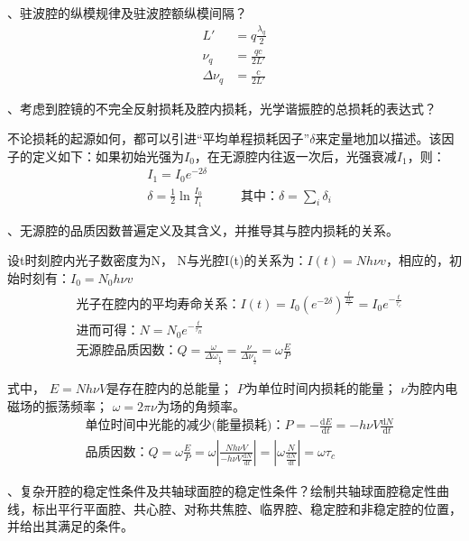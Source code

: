 \documentclass[12pt]{article}
\begin{document}
{、驻波腔的纵模规律及驻波腔额纵模间隔？
}
{\kaishu
\begin{align*}
    L'&=q\frac{\lambda_q}{2}\\
    \nu_q&=\frac{qc}{2L'}\\
    \Delta\nu_q&=\frac{c}{2L'}
\end{align*}
}

{、考虑到腔镜的不完全反射损耗及腔内损耗，光学谐振腔的总损耗的表达式？
}
{\kaishu
\par  
不论损耗的起源如何，都可以引进“平均单程损耗因子”$\delta$来定量地加以描述。该因子的定义如下：如果初始光强为$I_0$，在无源腔内往返一次后，光强衰减$I_1$，则：
\begin{align*}
    &I_1=I_0e^{-2\delta}\\
    &\delta=\frac{1}{2}\ln\frac{I_0}{I_1}
    \quad\quad\quad
    \text{其中：}\delta=\sum_i \delta_i
\end{align*}
}

{、无源腔的品质因数普遍定义及其含义，并推导其与腔内损耗的关系。
}
{\kaishu

设t时刻腔内光子数密度为N，
N与光腔I(t)的关系为：$I(t)=Nh\nu v$，相应的，初始时刻有：$I_0=N_0h\nu v $
\begin{align}
    &\text{光子在腔内的平均寿命关系：}
    I(t)
    =I_0(e^{-2\delta})^{\frac{t}{\frac{2L'}{c}}}
    =I_0e^{-\frac{t}{\tau_c}}\\
    &\text{进而可得：}N=N_0e^{-\frac{t}{\tau_R}}\\
    &\text{无源腔品质因数：}
    Q
    =\frac{\omega}{\Delta\omega_{\frac{1}{2}}}
    =\frac{\nu}{\Delta\nu_{\frac{1}{2}}}
    =\omega\frac{E}{P}
\end{align}
\par 式中，
$E=Nh\nu V$是存在腔内的总能量；
$P$为单位时间内损耗的能量；
$\nu$为腔内电磁场的振荡频率；
$\omega=2\pi\nu$为场的角频率。
\begin{align}
    &\text{单位时间中光能的减少(能量损耗)：}
    P
    =-\frac{\mathrm{d}E}{\mathrm{d}t}
    =-h\nu V\frac{\mathrm{d}N}{\mathrm{d}t}\\
    &\text{品质因数：}Q
    =\omega\frac{E}{P}=
    \omega\left|
    \frac
    {Nh\nu V}
    {-h\nu V\frac{\mathrm{d}N}{\mathrm{d}t}}
    \right|
    =
    \left|\omega\frac{N}{\frac{\mathrm{d}N}{\mathrm{d}t}}\right|
    =\omega\tau_c
\end{align}
}

\newpage
{、复杂开腔的稳定性条件及共轴球面腔的稳定性条件？绘制共轴球面腔稳定性曲线，标出平行平面腔、共心腔、对称共焦腔、临界腔、稳定腔和非稳定腔的位置，并给出其满足的条件。
}
\end{document}
